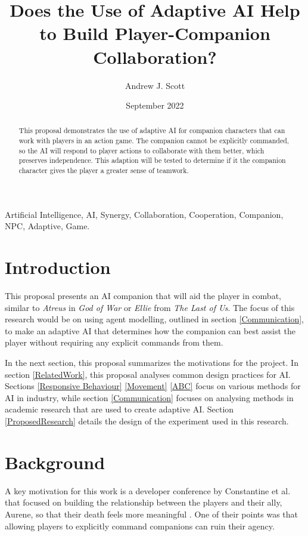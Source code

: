 \documentclass{IEEEtran}
\title{Does the Use of Adaptive AI Help to Build Player-Companion Collaboration?}
\author{Andrew J. Scott}
\date{September 2022}
\begin{document}
	\maketitle

\begin{abstract}
This proposal demonstrates the use of adaptive AI for companion characters that can work with players in an action game. The companion cannot be explicitly commanded, so the AI will respond to player actions to collaborate with them better, which preserves independence. This adaption will be tested to determine if it the companion character gives the player a greater sense of teamwork.
\end{abstract}

 \begin{IEEEkeywords}
Artificial Intelligence, AI, Synergy, Collaboration, Cooperation, Companion, NPC, Adaptive, Game.
\end{IEEEkeywords}

\section{Introduction}
\label{Intro}

This proposal presents an AI companion that will aid the player in combat, similar to \textit{Atreus} in \textit{God of War} or \textit{Ellie} from \textit{The Last of Us}. The focus of this research would be on using agent modelling, outlined in section \ref{Communication}, to make an adaptive AI that determines how the companion can best assist the player without requiring any explicit commands from them.

In the next section, this proposal summarizes the motivations for the project. In section \ref{RelatedWork}, this proposal analyses common design practices for AI. Sections \ref{Responsive Behaviour} \ref{Movement} \ref{ABC} focus on various methods for AI in industry, while section \ref{Communication} focuses on analysing methods in academic research that are used to create adaptive AI. Section \ref{ProposedResearch} details the design of the experiment used in this research.

\section{Background}
\label{Background}

A key motivation for this work is a developer conference by Constantine et al. that focused on building the relationship between the players and their ally, Aurene, so that their death feels more meaningful \cite{EGXCharacterDeathGuildWars}. One of their points was that allowing players to explicitly command companions can ruin their agency.
\end{document}
